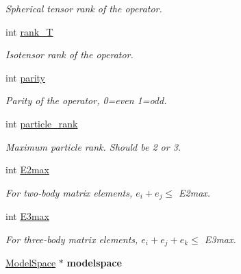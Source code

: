 \begin{DoxyCompactItemize}
\begin{DoxyCompactList}\small\item\em Spherical tensor rank of the operator. \end{DoxyCompactList}\item 
\hypertarget{classOperator_ac70ee8dbbc4cb4f61972575c68bb9a51}{int \hyperlink{classOperator_ac70ee8dbbc4cb4f61972575c68bb9a51}{rank\-\_\-\-T}}\label{classOperator_ac70ee8dbbc4cb4f61972575c68bb9a51}

\begin{DoxyCompactList}\small\item\em Isotensor rank of the operator. \end{DoxyCompactList}\item 
\hypertarget{classOperator_ad628e91e2dd2542c0f34e985271adcd3}{int \hyperlink{classOperator_ad628e91e2dd2542c0f34e985271adcd3}{parity}}\label{classOperator_ad628e91e2dd2542c0f34e985271adcd3}

\begin{DoxyCompactList}\small\item\em Parity of the operator, 0=even 1=odd. \end{DoxyCompactList}\item 
\hypertarget{classOperator_a44a74c03caff49e776433e885a724956}{int \hyperlink{classOperator_a44a74c03caff49e776433e885a724956}{particle\-\_\-rank}}\label{classOperator_a44a74c03caff49e776433e885a724956}

\begin{DoxyCompactList}\small\item\em Maximum particle rank. Should be 2 or 3. \end{DoxyCompactList}\item 
\hypertarget{classOperator_ace64ea3f299cfba00bc973e58ce03414}{int \hyperlink{classOperator_ace64ea3f299cfba00bc973e58ce03414}{E2max}}\label{classOperator_ace64ea3f299cfba00bc973e58ce03414}

\begin{DoxyCompactList}\small\item\em For two-\/body matrix elements, $ e_i + e_j \leq $ E2max. \end{DoxyCompactList}\item 
\hypertarget{classOperator_ad3ebb434f911b9cb7c54ca6990cdda8c}{int \hyperlink{classOperator_ad3ebb434f911b9cb7c54ca6990cdda8c}{E3max}}\label{classOperator_ad3ebb434f911b9cb7c54ca6990cdda8c}

\begin{DoxyCompactList}\small\item\em For three-\/body matrix elements, $ e_i + e_j + e_k \leq $ E3max. \end{DoxyCompactList}\item 
\hypertarget{classOperator_af08ef1c6d3ef38d08b4a6ea20b26ef22}{\hyperlink{classModelSpace}{Model\-Space} $\ast$ {\bfseries modelspace}}\label{classOperator_af08ef1c6d3ef38d08b4a6ea20b26ef22}


\end{DoxyCompactItemize}
